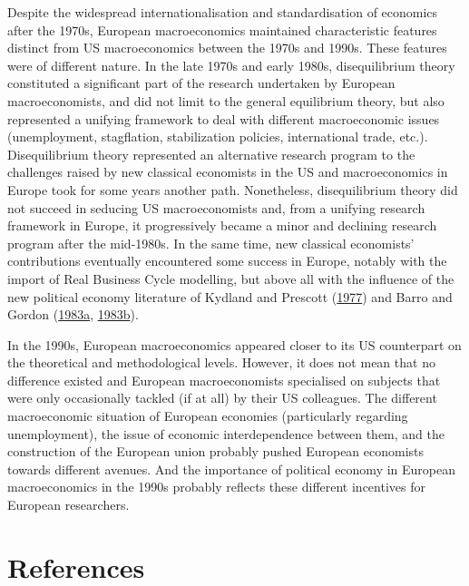 \documentclass[
  12pt,
  onecolumn]{article}
\begin{document}
Despite the widespread internationalisation and standardisation of
economics after the 1970s, European macroeconomics maintained
characteristic features distinct from US macroeconomics between the
1970s and 1990s. These features were of different nature. In the late
1970s and early 1980s, disequilibrium theory constituted a significant
part of the research undertaken by European macroeconomists, and did not
limit to the general equilibrium theory, but also represented a unifying
framework to deal with different macroeconomic issues (unemployment,
stagflation, stabilization policies, international trade, etc.).
Disequilibrium theory represented an alternative research program to the
challenges raised by new classical economists in the US and
macroeconomics in Europe took for some years another path. Nonetheless,
disequilibrium theory did not succeed in seducing US macroeconomists
and, from a unifying research framework in Europe, it progressively
became a minor and declining research program after the mid-1980s. In
the same time, new classical economists' contributions eventually
encountered some success in Europe, notably with the import of Real
Business Cycle modelling, but above all with the influence of the new
political economy literature of Kydland and Prescott
(\protect\hyperlink{ref-kydland1977}{1977}) and Barro and Gordon
(\protect\hyperlink{ref-barro1983}{1983a},
\protect\hyperlink{ref-barro1983c}{1983b}).

In the 1990s, European macroeconomics appeared closer to its US
counterpart on the theoretical and methodological levels. However, it
does not mean that no difference existed and European macroeconomists
specialised on subjects that were only occasionally tackled (if at all)
by their US colleagues. The different macroeconomic situation of
European economies (particularly regarding unemployment), the issue of
economic interdependence between them, and the construction of the
European union probably pushed European economists towards different
avenues. And the importance of political economy in European
macroeconomics in the 1990s probably reflects these different incentives
for European researchers.

\newpage

\hypertarget{references}{%
\section*{References}\label{references}}
\end{document}
